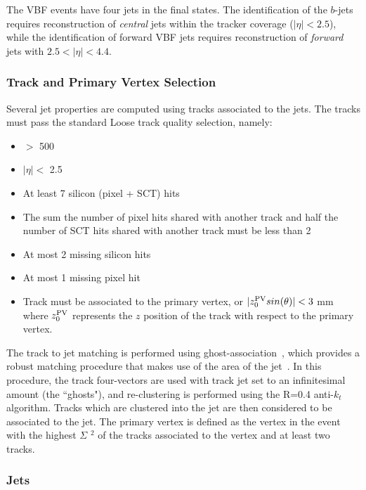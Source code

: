 \label{sec:vbf-objsel}

The VBF \Hbb events have four jets in the final states.
The identification of the $b$-jets requires reconstruction of
{\it central} jets within the tracker coverage ($|\eta|<2.5$), while
the identification of forward VBF jets requires reconstruction
of {\it forward} jets with $2.5<|\eta|<4.4$. 


\subsubsection{Track and Primary Vertex Selection}

Several jet properties are computed using tracks associated to the jets. The tracks must pass the standard Loose track quality selection, namely:

\begin{itemize}
\item \pT $>$ 500 \mev
\item $|\eta| < $ 2.5
\item At least 7 silicon (pixel + SCT) hits
\item The sum the number of pixel hits shared with another track and half the number of SCT hits shared with another track must be less than 2
\item At most 2 missing silicon hits
\item At most 1 missing pixel hit
\item Track must be associated to the primary vertex, or $|z_0^{\rm PV}sin(\theta)| < 3$ mm  where $z_0^{\rm PV}$ represents the $z$ position of the track with respect to the primary vertex.
\end{itemize}

The track to jet matching is performed using ghost-association~\cite{GhostMatching,jetareas,atlasjetsub}, which provides a robust matching procedure that makes use of the area of the jet~\cite{GhostMatching}. In this procedure, the track four-vectors are used with track jet \pT set to an infinitesimal amount (the ``ghosts"), and re-clustering is performed using the R=0.4 anti-$k_t$
algorithm.  Tracks which are clustered into the jet are then considered to be associated to the jet.  
The primary vertex is defined as the vertex in the event with the highest $\Sigma$ \pT$^2$ of the tracks associated to the vertex and at least two tracks.


\subsubsection{Jets}
\label{sec:vbf-jets}

